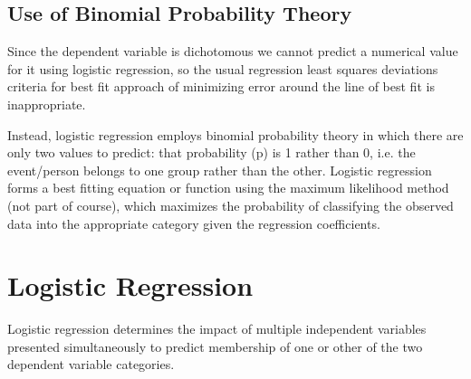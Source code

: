\documentclass[a4paper,12pt]{article}
\begin{document}
\subsection{Use of Binomial Probability Theory}
Since the dependent variable is dichotomous we cannot predict a numerical value for it
using logistic regression, so the usual regression least squares deviations criteria for best fit
approach of minimizing error around the line of best fit is inappropriate.

Instead, logistic regression employs binomial probability theory in which there are only two values to
predict: that probability (p) is 1 rather than 0, i.e. the event/person belongs to one group
rather than the other. Logistic regression forms a best fitting equation or function using the
maximum likelihood method (not part of course), which maximizes the probability of classifying the observed
data into the appropriate category given the regression coefficients.

\newpage
\section{Logistic Regression}
Logistic regression determines the impact of multiple independent variables
presented simultaneously to predict membership of one or other of the two
dependent variable categories.
\end{document}

